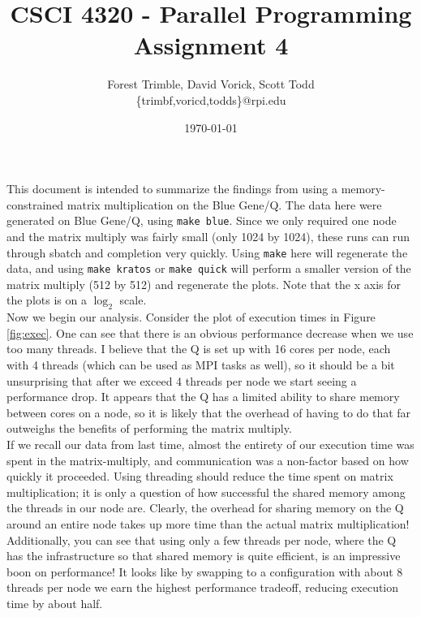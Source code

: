 \documentclass[twocolumn]{article}
\title{CSCI 4320 - Parallel Programming\\Assignment 4}
\author{Forest Trimble, David Vorick, Scott Todd\\\{trimbf,voricd,todds\}@rpi.edu}
\date{\today}
\begin{document}
\maketitle

\pagestyle{fancy}
\fancyhead{}
\fancyhead[R]{\today}

This document is intended to summarize the findings from using a 
memory-constrained matrix multiplication on the Blue Gene/Q. The data here were 
generated on Blue Gene/Q, using \texttt{make blue}. Since we only required one 
node and the matrix multiply was fairly small (only 1024 by 1024), these runs
can run through sbatch and completion very quickly. Using \texttt{make} here will
regenerate the data, and using \texttt{make kratos} or \texttt{make quick} 
will perform a smaller version of the matrix multiply (512 by 512) and regenerate
the plots. Note that the x axis for the plots is on a $\log_2$ scale.\\

Now we begin our analysis. Consider the plot of execution times in Figure 
\ref{fig:exec}. One can see that there is an obvious performance decrease when we
use too many threads. I believe that the Q is set up with 16 cores per node, each 
with 4 threads (which can be used as MPI tasks as well), so it should be a bit 
unsurprising that after we exceed 4 threads per node we start seeing a performance
drop. It appears that the Q has a limited ability to share memory between cores on 
a node, so it is likely that the overhead of having to do that far outweighs the
benefits of performing the matrix multiply. \\

If we recall our data from last time, almost the entirety of our 
execution time was spent in the matrix-multiply, and communication was a 
non-factor based on how quickly it proceeded. Using threading should reduce the 
time spent on matrix multiplication; it is only a question of how successful the
shared memory among the threads in our node are. Clearly, the overhead for sharing
memory on the Q around an entire node takes up more time than the actual matrix 
multiplication! Additionally, you can see that using only a few threads per node, 
where the Q has the infrastructure so that shared memory is quite efficient, is an
impressive boon on performance! It looks like by swapping to a configuration with
about 8 threads per node we earn the highest performance tradeoff, reducing 
execution time by about half. \\
\end{document}

